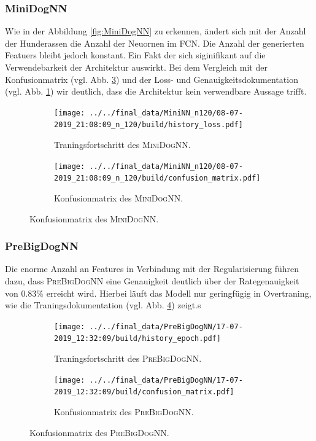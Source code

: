 \subsubsection{MiniDogNN}
Wie in der Abbildung \ref{fig:MiniDogNN} zu erkennen, ändert sich mit der
Anzahl der Hunderassen die Anzahl der Neuornen im FCN. Die Anzahl der generierten
Featuers bleibt jedoch konstant. Ein Fakt der sich siginifikant auf die
Verwendebarkeit der Architektur auswirkt. Bei dem Vergleich mit der Konfusionmatrix
(vgl. Abb. \ref{fig:MiniDogNN_120_Konfusionmatrix}) und
der Loss- und Genauigkeitsdokumentation (vgl. Abb. \ref{fig:MiniDogNN_120_Loss_Acc})
wir deutlich, dass die Architektur kein verwendbare Aussage trifft.
\begin{figure}
\centering
\begin{subfigure}{0.48\textwidth}
\centering
\texttt{[image: ../../final\_data/MiniNN\_n120/08-07-2019\_21:08:09\_n\_120/build/history\_loss.pdf]}
\caption{Traningsfortschritt des \textsc{MiniDogNN}.}
\label{fig:MiniDogNN_120_Loss_Acc}
\end{subfigure}
\begin{subfigure}{0.48\textwidth}
\centering
\texttt{[image: ../../final\_data/MiniNN\_n120/08-07-2019\_21:08:09\_n\_120/build/confusion\_matrix.pdf]}
\caption{Konfusionmatrix des \textsc{MiniDogNN}.}
\label{fig:MiniDogNN_120_Konfusionmatrix}
\end{subfigure}
\end{figure}
\subsubsection{PreBigDogNN}
Die enorme Anzahl an Features in Verbindung mit der Regularisierung führen dazu,
dass \textsc{PreBigDogNN} eine Genauigkeit deutlich über der Rategenauigkeit
von $0.83\%$ erreicht wird. Hierbei läuft das Modell nur geringfügig in Overtraning,
wie die Traningsdokumentation (vgl. Abb. \ref{fig:PreBigDogNN_Loss_Acc}) zeigt.s
\begin{figure}
\centering
\begin{subfigure}{0.48\textwidth}
\centering
\texttt{[image: ../../final\_data/PreBigDogNN/17-07-2019\_12:32:09/build/history\_epoch.pdf]}
\caption{Traningsfortschritt des \textsc{PreBigDogNN}.}
\label{fig:PreBigDogNN_Loss_Acc}
\end{subfigure}
\begin{subfigure}{0.48\textwidth}
\centering
\texttt{[image: ../../final\_data/PreBigDogNN/17-07-2019\_12:32:09/build/confusion\_matrix.pdf]}
\caption{Konfusionmatrix des \textsc{PreBigDogNN}.}
\label{fig:PreBigDogNN_Konfusionmatrix}
\end{subfigure}
\end{figure}

